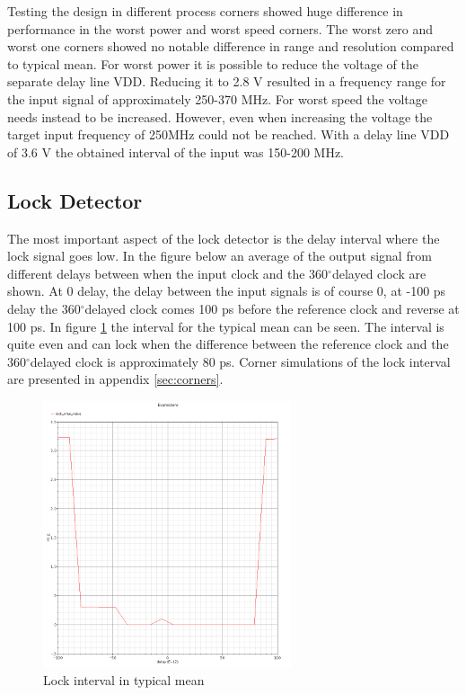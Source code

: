 \documentclass[a4paper,12pt]{article} \usepackage{graphicx}
\newcommand{\degree}{\ensuremath{^\circ}}
\begin{document}
Testing the design in different process corners showed huge difference in
performance in the worst power and worst speed corners. The worst zero and worst
one corners showed no notable difference in range and resolution compared to typical
mean. For worst power it is possible to reduce the voltage of the separate delay
line VDD. Reducing it to 2.8 V resulted in a frequency range for the input signal
of approximately 250-370 MHz. For worst speed the voltage needs instead to be
increased. However, even when increasing the voltage the target input frequency
of 250MHz could not be reached. With a delay line VDD of 3.6 V the obtained
interval of the input was 150-200 MHz.   

\subsection{Lock Detector}
The most important aspect of the lock detector is the delay interval where
the lock signal goes low. In the figure below an average of the
output signal from different delays between when the input clock and the
360\degree delayed clock are shown. At 0 delay, the delay between the input
signals is of course 0, at -100 ps delay the 360\degree delayed clock comes 100 ps
before the reference clock and reverse at 100 ps. In figure
\ref{fig:LDtm} the interval for the typical mean can be seen. The interval 
is quite even and can lock when the difference between the reference
clock and the 360\degree delayed clock is approximately 80 ps. Corner simulations of the lock interval are presented in
appendix \ref{sec:corners}.

\begin{figure}[h]
  \centering
  \includegraphics[width=0.65\textwidth]{../Bilder/LD_tran/LD_lsim_tm.png}
  \caption{Lock interval in typical mean}
  \label{fig:LDtm}
\end{figure}
\end{document}
